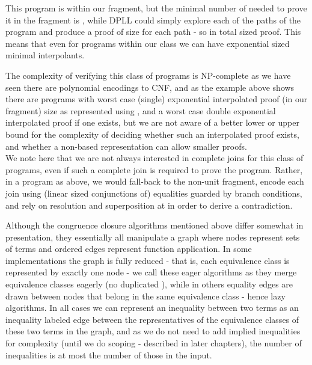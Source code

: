 This program is within our fragment, but the minimal number of \GFAECs needed to prove it in the fragment is , while DPLL could simply explore each of the  paths of the program and produce a proof of size  for each path - so in total  sized proof.
This means that even for programs within our class we can have exponential sized minimal interpolants.

The complexity of verifying this class of programs is NP-complete as we have seen there are polynomial encodings to CNF, 
and as the example above shows there are programs with worst case (single) exponential interpolated proof (in our fragment) size as represented using \GFAECSet, and a worst case double exponential interpolated proof if one exists, but we are not aware of a better lower or upper bound for the complexity of deciding whether such an interpolated proof exists, and whether a non-\GFAEC based representation can allow smaller proofs. \\
We note here that we are not always interested in complete joins for this class of programs, even if such a complete join is required to prove the program. 
Rather, in a program as above, we would fall-back to the non-unit fragment, 
encode each join using (linear sized conjunctions of) equalities guarded by branch conditions, and rely on resolution and superposition at  in order to derive a contradiction.

Although the congruence closure algorithms mentioned above differ somewhat in presentation, they essentially all manipulate a graph where nodes represent sets of terms and ordered edges represent function application. In some implementations the graph is fully reduced - that is, each equivalence class is represented by exactly one node - we call these eager algorithms as they merge equivalence classes eagerly (no duplicated \GFAECSet), while in others equality edges are drawn between nodes that belong in the same equivalence class - hence lazy algorithms.
In all cases we can represent an inequality between two terms as an inequality labeled edge between the representatives of the equivalence classes of these two terms in the graph, and as we do not need to add implied inequalities for complexity (until we do scoping - described in later chapters), the number of inequalities is at most the number of those in the input.

